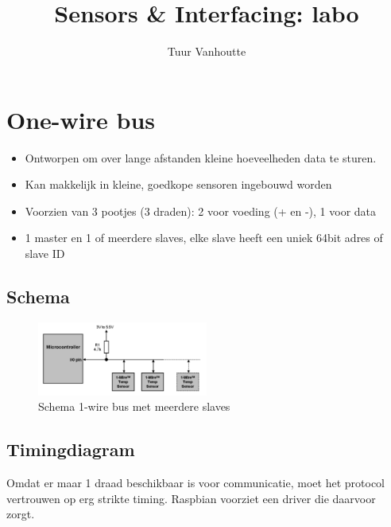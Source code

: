 \documentclass{article}
\begin{document}
\begin{titlepage}
    \author{Tuur Vanhoutte}
    \title{Sensors \& Interfacing: labo}
\end{titlepage}

\maketitle
\newpage
\tableofcontents
\newpage


\section{One-wire bus}
\begin{itemize}
    \item Ontworpen om over lange afstanden kleine hoeveelheden data te sturen. 
    \item Kan makkelijk in kleine, goedkope sensoren ingebouwd worden
    \item Voorzien van 3 pootjes (3 draden): 2 voor voeding (+ en -), 1 voor data
    \item 1 master en 1 of meerdere slaves, elke slave heeft een uniek 64bit adres of slave ID
\end{itemize}




\subsection{Schema}

\begin{figure}[H]
    \centering
    \includegraphics[width=0.5\textwidth]{Screenshot_20200619_150049.png}
    \caption{Schema 1-wire bus met meerdere slaves}
\end{figure}

\subsection{Timingdiagram}
Omdat er maar 1 draad beschikbaar is voor communicatie, moet het protocol vertrouwen op erg strikte timing.
Raspbian voorziet een driver die daarvoor zorgt.
\end{document}
